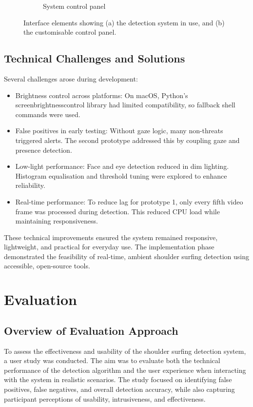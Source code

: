 \documentclass[12pt]{article}
\theoremstyle{plain}
\theoremstyle{definition}
\begin{document}
\begin{figure}[h!]
\begin{subfigure}[c]{0.45\textwidth}
    \caption{System control panel}
    \label{fig:gui_controls}
  \end{subfigure}
  \caption{Interface elements showing (a) the detection system in use, and (b) the customisable control panel.}
  \label{fig:gui_overview}
\end{figure}

\subsection{Technical Challenges and Solutions}

Several challenges arose during development:
\begin{itemize}
  \item Brightness control across platforms: On macOS, Python’s screen\textunderscore brightness\textunderscore control library had limited compatibility, so fallback shell commands were used.
  \item False positives in early testing: Without gaze logic, many non-threats triggered alerts. The second prototype addressed this by coupling gaze and presence detection.
  \item Low-light performance: Face and eye detection reduced in dim lighting. Histogram equalisation and threshold tuning were explored to enhance reliability.
  \item Real-time performance: To reduce lag for prototype 1, only every fifth video frame was processed during detection. This reduced CPU load while maintaining responsiveness.
\end{itemize}

These technical improvements ensured the system remained responsive, lightweight, and practical for everyday use. The implementation phase demonstrated the feasibility of real-time, ambient shoulder surfing detection using accessible, open-source tools.

\section{Evaluation}

\subsection{Overview of Evaluation Approach}

To assess the effectiveness and usability of the shoulder surfing detection system, a user study was conducted. The aim was to evaluate both the technical performance of the detection algorithm and the user experience when interacting with the system in realistic scenarios. The study focused on identifying false positives, false negatives, and overall detection accuracy, while also capturing participant perceptions of usability, intrusiveness, and effectiveness.
\end{document}
